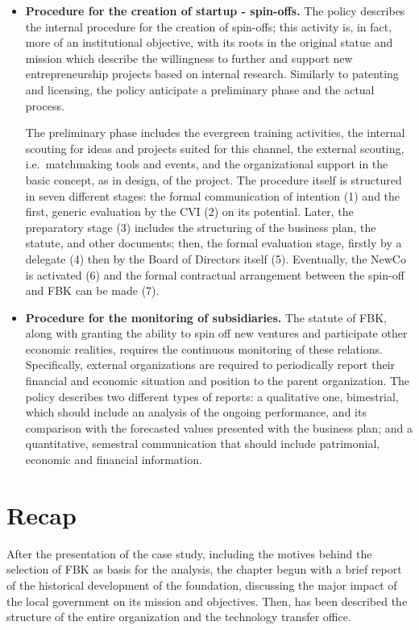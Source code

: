 \begin{itemize}
\item \textbf{Procedure for the creation of startup - spin-offs.} The policy describes the internal procedure for the creation of spin-offs; this activity is, in fact, more of an institutional objective, with its roots in the original statue and mission which describe the willingness to further and support new entrepreneurship projects based on internal research. Similarly to patenting and licensing, the policy anticipate a preliminary phase and the actual process.

The preliminary phase includes the evergreen training activities, the internal scouting for ideas and projects suited for this channel, the external scouting, i.e.\ matchmaking tools and events, and the organizational support in the basic concept, as in design, of the project. The procedure itself is structured in seven different stages: the formal communication of intention (1) and the first, generic evaluation by the CVI (2) on its potential. Later, the preparatory stage (3) includes the structuring of the business plan, the statute, and other documents; then, the formal evaluation stage, firstly by a delegate (4) then by the Board of Directors itself (5). Eventually, the NewCo is activated (6) and the formal contractual arrangement between the spin-off and FBK can be made (7).

\item \textbf{Procedure for the monitoring of subsidiaries.} The statute of FBK, along with granting the ability to spin off new ventures and participate other economic realities, requires the continuous monitoring of these relations. Specifically, external organizations are required to periodically report their financial and economic situation and position to the parent organization. The policy describes two different types of reports: a qualitative one, bimestrial, which should include an analysis of the ongoing performance, and its comparison with the forecasted values presented with the business plan; and a quantitative, semestral communication that should include patrimonial, economic and financial information.

\end{itemize} 

\section{Recap}

After the presentation of the case study, including the motives behind the selection of FBK as basis for the analysis, the chapter begun with a brief report of the historical development of the foundation, discussing the major impact of the local government on its mission and objectives. Then, has been described the structure of the entire organization and the technology transfer office. 

